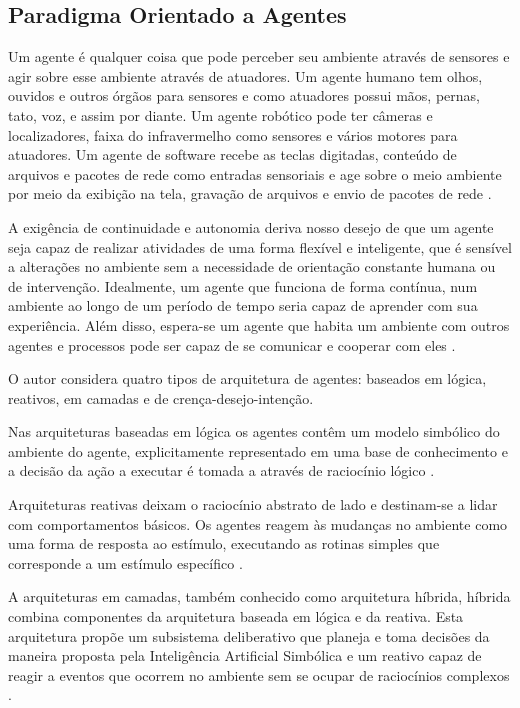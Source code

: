 \subsection{Paradigma Orientado a Agentes}

Um agente é qualquer coisa que pode perceber seu ambiente através de sensores e agir sobre esse ambiente através de atuadores. Um agente humano tem olhos, ouvidos e outros órgãos para sensores e como atuadores possui mãos, pernas, tato, voz, e assim por diante. Um agente robótico pode ter câmeras e localizadores, faixa do infravermelho como sensores e vários motores para atuadores. Um agente de software recebe as teclas digitadas, conteúdo de arquivos e pacotes de rede como entradas sensoriais e age sobre o meio ambiente por meio da exibição na tela, gravação de arquivos e envio de pacotes de rede \cite[pág.~34]{russel1995}.

A exigência de continuidade e autonomia deriva nosso desejo de que um agente seja capaz de realizar atividades de uma forma flexível e inteligente, que é sensível a alterações no ambiente sem a necessidade de orientação constante humana ou de intervenção. Idealmente, um agente que funciona de forma contínua, num ambiente ao longo de um período de tempo seria capaz de aprender com sua experiência. Além  disso, espera-se um agente que habita um ambiente com outros agentes e processos pode ser capaz de se comunicar e cooperar com eles \cite[pág.~8]{bradshaw1997}.

O autor  considera quatro tipos de arquitetura de  agentes: baseados em lógica, reativos, em camadas e de crença-desejo-intenção.

\begin{citacao}
Nas arquiteturas baseadas em lógica os agentes contêm um modelo simbólico do ambiente do agente, explicitamente representado em uma base de conhecimento e a decisão da ação a executar é tomada a através de raciocínio lógico \cite[pág.~3]{girardi2004}.
\end{citacao}

Arquiteturas reativas deixam o raciocínio abstrato de lado e destinam-se a lidar com comportamentos básicos. Os agentes reagem às mudanças no ambiente como uma forma de resposta ao estímulo, executando as rotinas simples que corresponde a um estímulo específico \cite[pág.~13]{schumacher2001}.

A arquiteturas em camadas, também conhecido como arquitetura híbrida, híbrida combina componentes da arquitetura baseada em lógica e da reativa. Esta arquitetura propõe um subsistema deliberativo que planeja e toma decisões da maneira proposta pela Inteligência Artificial Simbólica e um reativo capaz de reagir a eventos que ocorrem no ambiente sem se ocupar de raciocínios complexos \cite[pág.~44]{ferreira2004}.

